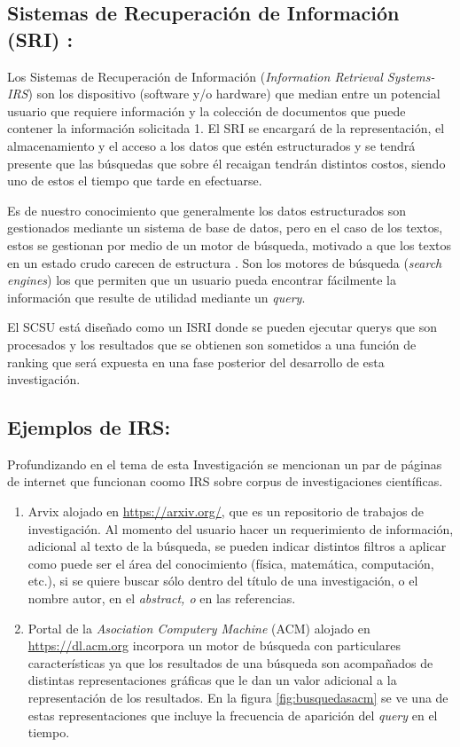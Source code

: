 \documentclass[
  10,
  openany]{book}
\begin{document}
\hypertarget{SRI}{%
\subsection{Sistemas de Recuperación de Información (SRI) :}\label{SRI}}

Los Sistemas de Recuperación de Información (\emph{Information Retrieval Systems-IRS}) son los dispositivo (software y/o hardware) que median entre un potencial usuario que requiere información y la colección de documentos que puede contener la información solicitada \citep{kraft2017} 1. El SRI se encargará de la representación, el almacenamiento y el acceso a los datos que estén estructurados y se tendrá presente que las búsquedas que sobre él recaigan tendrán distintos costos, siendo uno de estos el tiempo que tarde en efectuarse.

Es de nuestro conocimiento que generalmente los datos estructurados son gestionados mediante un sistema de base de datos, pero en el caso de los textos, estos se gestionan por medio de un motor de búsqueda, motivado a que los textos en un estado crudo carecen de estructura \citep{miningt2012} . Son los motores de búsqueda (\emph{search engines}) los que permiten que un usuario pueda encontrar fácilmente la información que resulte de utilidad mediante un \emph{query}.

El SCSU está diseñado como un ISRI donde se pueden ejecutar querys que son procesados y los resultados que se obtienen son sometidos a una función de ranking que será expuesta en una fase posterior del desarrollo de esta investigación.

\hypertarget{ejemplos-de-irs}{%
\subsection{Ejemplos de IRS:}\label{ejemplos-de-irs}}

Profundizando en el tema de esta Investigación se mencionan un par de páginas de internet que funcionan coomo IRS sobre corpus de investigaciones científicas.

\begin{enumerate}
\def\labelenumi{\arabic{enumi}.}
\item
  Arvix alojado en \url{https://arxiv.org/}, que es un repositorio de trabajos de investigación. Al momento del usuario hacer un requerimiento de información, adicional al texto de la búsqueda, se pueden indicar distintos filtros a aplicar como puede ser el área del conocimiento (física, matemática, computación, etc.), si se quiere buscar sólo dentro del título de una investigación, o el nombre autor, en el \emph{abstract, o} en las referencias.
\item
  Portal de la \emph{Asociation Computery Machine} (ACM) alojado en \url{https://dl.acm.org} incorpora un motor de búsqueda con particulares características ya que los resultados de una búsqueda son acompañados de distintas representaciones gráficas que le dan un valor adicional a la representación de los resultados. En la figura \ref{fig:busquedasacm} se ve una de estas representaciones que incluye la frecuencia de aparición del \emph{query} en el tiempo.
\end{enumerate}
\end{document}
